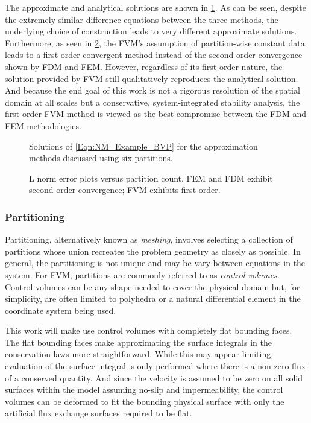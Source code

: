 The approximate and analytical solutions are shown in \cref{Fig:NM_Example_ApproximationComparison}.
As can be seen, despite the extremely similar difference equations between the three methods, the underlying choice of construction leads to very different approximate solutions.
Furthermore, as seen in \cref{Fig:NM_Example_ApproximationComparisonError}, the FVM's assumption of partition-wise constant data leads to a first-order convergent method instead of the second-order convergence shown by FDM and FEM.
However, regardless of its first-order nature, the solution provided by FVM still qualitatively reproduces the analytical solution.
And because the end goal of this work is not a rigorous resolution of the spatial domain at all scales but a conservative, system-integrated stability analysis, the first-order FVM method is viewed as the best compromise between the FDM and FEM methodologies.


\begin{figure}%
    \centering
    \caption{Solutions of \cref{Eqn:NM_Example_BVP} for the approximation methods discussed using six partitions.}
    \label{Fig:NM_Example_ApproximationComparison}
\end{figure}
\begin{figure}%
    \centering
    \caption{L norm error plots versus partition count. FEM and FDM exhibit second order convergence; FVM exhibits first order.}%
    \label{Fig:NM_Example_ApproximationComparisonError}
\end{figure}


\subsubsection{Partitioning}

Partitioning, alternatively known as \textit{meshing}, involves selecting a collection of partitions whose union recreates the problem geometry as closely as possible.
In general, the partitioning is not unique and may be vary between equations in the system.
For FVM, partitions are commonly referred to as \textit{control volumes}.
Control volumes can be any shape needed to cover the physical domain but, for simplicity, are often limited to polyhedra or a natural differential element in the coordinate system being used.

This work will make use control volumes with completely flat bounding faces.
The flat bounding faces make approximating the surface integrals in the conservation laws more straightforward.
While this may appear limiting, evaluation of the surface integral is only performed where there is a non-zero flux of a conserved quantity.
And since the velocity is assumed to be zero on all solid surfaces within the model assuming no-slip and impermeability, the control volumes can be deformed to fit the bounding physical surface with only the artificial flux exchange surfaces required to be flat.

